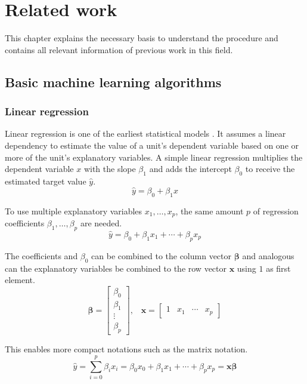 \chapter{Related work}
This chapter explains the necessary basis to understand the procedure and contains all relevant information of previous work in this field.
\section{Basic machine learning algorithms}

\subsection{Linear regression}
Linear regression is one of the earliest statistical models \autocite{freedman2009}. It assumes a linear dependency to estimate the value of a unit's dependent variable based on one or more of the unit's explanatory variables. A simple linear regression multiplies the dependent variable $x$ with the slope $\beta_1$ and adds the intercept $\beta_0$ to receive the estimated target value $\hat{y}$.
\begin{equation}
    \hat{y} = \beta_0 + \beta_1 x
\end{equation}

To use multiple explanatory variables $x_1, \ldots, x_p$, the same amount $p$ of regression coefficients $\beta_1, \ldots, \beta_p$ are needed.
\begin{equation}
    \hat{y} = \beta_0 + \beta_1 x_1 + \cdots + \beta_p x_p
\end{equation}

The coefficients and $\beta_0$ can be combined to the column vector $\boldsymbol{\beta}$ and analogous can the explanatory variables be combined to the row vector $\mathbf{x}$ using $1$ as first element.
\begin{equation}
    \boldsymbol{\beta} = \begin{bmatrix}\beta_0\\\beta_1\\\vdots\\\beta_p\end{bmatrix}\text{,}\quad
    \mathbf{x} = \begin{bmatrix}1&x_1&\cdots&x_p\end{bmatrix}
\end{equation}

This enables more compact notations such as the matrix notation.
\begin{equation}
    \hat{y} = \sum_{i=0}^p \beta_i x_i = \beta_0 x_0 + \beta_1 x_1 + \cdots + \beta_p x_p = \mathbf{x}\boldsymbol{\beta}
\end{equation}

